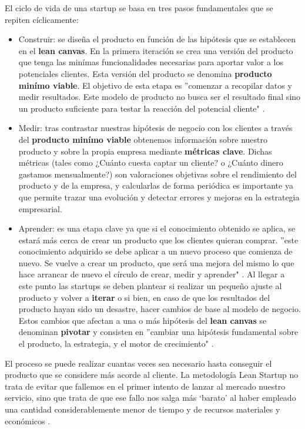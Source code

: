 El ciclo de vida de una startup se basa en tres pasos fundamentales que se repiten cíclicamente:
\begin{itemize}
	\item Construir: se diseña el producto en función de las hipótesis que se establecen en el \textbf{lean canvas}. En la primera iteración se crea una versión del producto que tenga las minímas funcionalidades necesarias para aportar valor a los potenciales clientes. Esta versión del producto se denomina \textbf{producto minímo viable}. El objetivo de esta etapa es ''comenzar a recopilar datos y medir resultados. Este modelo de producto no busca ser el resultado final sino un producto suficiente para testar la reacción del potencial cliente" \cite{antevenio2016}.
	\item Medir: tras contrastar nuestras hipótesis de negocio con los clientes a través del \textbf{producto minímo viable} obtenemos información sobre nuestro producto y sobre la propia empresa mediante \textbf{métricas clave}. Dichas métricas (tales como ¿Cuánto cuesta captar un cliente? o ¿Cuánto dinero gastamos mensualmente?) son valoraciones objetivas sobre el rendimiento del producto y de la empresa, y calcularlas de forma periódica es importante ya que permite trazar una evolución y detectar errores y mejoras en la estrategia empresarial.
	\item Aprender: es una etapa clave ya que si el conocimiento obtenido se aplica, se estará más cerca de crear un producto que los clientes quieran comprar. ''este conocimiento adquirido se debe aplicar a un nuevo proceso que comienza de nuevo. Se vuelve a crear un producto, que será una mejora del mismo lo que hace arrancar de nuevo el círculo de crear, medir y aprender" \cite{antevenio2016}. Al llegar a este punto las startups se deben plantear si realizar un pequeño ajuste al producto y volver a \textbf{iterar} o si bien, en caso de que los resultados del producto hayan sido un desastre, hacer cambios de base al modelo de negocio. Estos cambios que afectan a una o más hipótesis del \textbf{lean canvas} se denominan \textbf{pivotar} y consisten en ''cambiar una hipótesis fundamental sobre el producto, la estrategia, y el motor de crecimiento" \cite{emooc}.
\end{itemize}

El proceso se puede realizar cuantas veces sea necesario hasta conseguir el producto que se considere más acorde al cliente. La metodología Lean Startup no trata de evitar que fallemos en el primer intento de lanzar al mercado nuestro servicio, sino que trata de que ese fallo nos salga más ‘barato’ al haber empleado una cantidad considerablemente menor de tiempo y de recursos materiales y económicos \cite{andreapelaez} .






